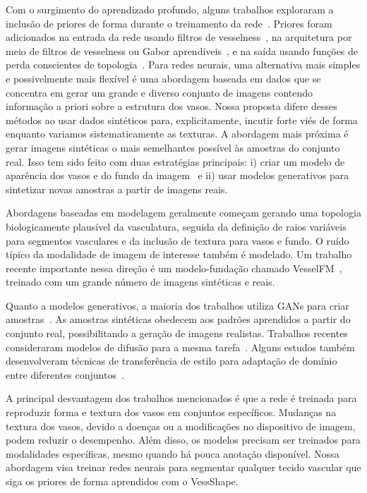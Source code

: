 \documentclass[%
reprint,
nofootinbib,
 amsmath,amssymb,
aps,
floatfix,
superscriptaddress,
showkeys,
longbibliography
]{revtex4-1}
\begin{document}
Com o surgimento do aprendizado profundo, alguns trabalhos exploraram a inclusão de priores de forma durante o treinamento da rede~\cite{bohlender2021survey}. Priores foram adicionados na entrada da rede usando filtros de vesselness~\cite{affane2022robust,hu2024domain,garret2024deep}, na arquitetura por meio de filtros de vesselness ou Gabor aprendíveis~\cite{chen2023learnable,fu2018frangi,volkov2025modification}, e na saída usando funções de perda conscientes de topologia~\cite{shit2021cldice,hu2019topology,berger2024topologically}. Para redes neurais, uma alternativa mais simples e possivelmente mais flexível é uma abordagem baseada em dados que se concentra em gerar um grande e diverso conjunto de imagens contendo informação a priori sobre a estrutura dos vasos. Nossa proposta difere desses métodos ao usar dados sintéticos para, explicitamente, incutir forte viés de forma enquanto variamos sistematicamente as texturas. A abordagem mais próxima é gerar imagens sintéticas o mais semelhantes possível às amostras do conjunto real. Isso tem sido feito com duas estratégias principais: i) criar um modelo de aparência dos vasos e do fundo da imagem~\cite{tetteh2020deepvesselnet,wittmann2025vesselfm,wittmann2024simulation,mathys2025synthetic} e ii) usar modelos generativos para sintetizar novas amostras a partir de imagens reais.

Abordagens baseadas em modelagem geralmente começam gerando uma topologia biologicamente plausível da vasculatura, seguida da definição de raios variáveis para segmentos vasculares e da inclusão de textura para vasos e fundo. O ruído típico da modalidade de imagem de interesse também é modelado. Um trabalho recente importante nessa direção é um modelo-fundação chamado VesselFM~\cite{wittmann2025vesselfm}, treinado com um grande número de imagens sintéticas e reais.

Quanto a modelos generativos, a maioria dos trabalhos utiliza GANs para criar amostras~\cite{you2022application,andreini2021two,tavakkoli2020novel,costa2017end}. As amostras sintéticas obedecem aos padrões aprendidos a partir do conjunto real, possibilitando a geração de imagens realistas. Trabalhos recentes consideraram modelos de difusão para a mesma tarefa~\cite{go2024generation,guo2025vesseldiffusion,wang2025vastsd}. Alguns estudos também desenvolveram técnicas de transferência de estilo para adaptação de domínio entre diferentes conjuntos~\cite{peng2022unsupervised,chen2023segmentation,chen2021real}.

A principal desvantagem dos trabalhos mencionados é que a rede é treinada para reproduzir forma e textura dos vasos em conjuntos específicos. Mudanças na textura dos vasos, devido a doenças ou a modificações no dispositivo de imagem, podem reduzir o desempenho. Além disso, os modelos precisam ser treinados para modalidades específicas, mesmo quando há pouca anotação disponível. Nossa abordagem visa treinar redes neurais para segmentar qualquer tecido vascular que siga os priores de forma aprendidos com o VessShape.
\end{document}
